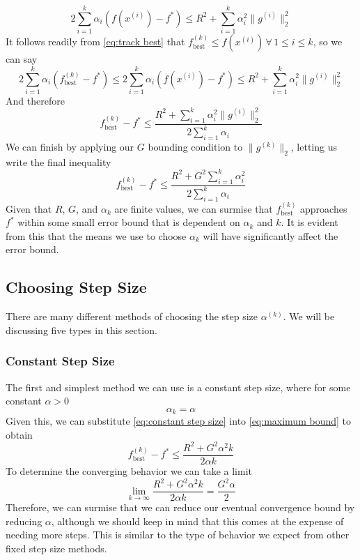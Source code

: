 \documentclass[journal,onecolumn]{IEEEtran}
\DeclareMathOperator{\best}{best}
\let\oldforall\forall
\renewcommand{\forall}{ \, \oldforall \, }
\begin{document}
\begin{equation}
    2\sum^k_{i=1}\alpha_i (f(x^{(i)})-f^*) \leq R^2  + \sum^k_{i=1}\alpha^2_i\|g^{(i)}\|^2_2
\end{equation}
It follows readily from \eqref{eq:track best} that \(f^{(k)}_{\best} \leq f(x^{(i)}) \forall 1 \leq i \leq k\), so we can say
\begin{equation}
    2\sum^k_{i=1}\alpha_i (f^{(k)}_{\best}-f^*) \leq 2\sum^k_{i=1}\alpha_i (f(x^{(i)})-f^*) \leq R^2  + \sum^k_{i=1}\alpha^2_i\|g^{(i)}\|^2_2
\end{equation}
And therefore
\begin{equation}\label{eq:general bound}
    f^{(k)}_{\best}-f^* \leq \frac{R^2  + \sum^k_{i=1}\alpha^2_i\|g^{(i)}\|^2_2}{2\sum^k_{i=1}\alpha_i}
\end{equation}
We can finish by applying our \(G\) bounding condition to \(\|g^{(k)}\|_2\), letting us write the final inequality
\begin{equation}\label{eq:maximum bound}
    f^{(k)}_{\best}-f^* \leq \frac{R^2  + G^2 \sum^k_{i=1}\alpha^2_i}{2\sum^k_{i=1}\alpha_i}
\end{equation}
Given that \(R\), \(G\), and \(\alpha_k\) are finite values, we can surmise that \(f^{(k)}_{\best}\) approaches \(f^*\) within some small error bound that is dependent on \(\alpha_k\) and \(k\). It is evident from this that the means we use to choose \(\alpha_k\) will have significantly affect the error bound.

\subsection{Choosing Step Size}\label{sec:choosing step size}
There are many different methods of choosing the step size \(\alpha^{(k)}\). We will be discussing five types in this section.

\subsubsection{Constant Step Size}\label{sec:constant step size}
The first and simplest method we can use is a constant step size, where for some constant \(\alpha > 0\)
\begin{equation}\label{eq:constant step size}
\alpha_{k} = \alpha
\end{equation}
Given this, we can substitute \eqref{eq:constant step size} into \eqref{eq:maximum bound} to obtain
\begin{equation}\label{eq:constant step size bound}
f^{(k)}_{\best}-f^* \leq \frac{R^2  + G^2 \alpha^2 k}{2\alpha k}
\end{equation}
To determine the converging behavior we can take a limit
\begin{equation}\label{eq:constant step size convergence}
\lim_{k \rightarrow \infty} \frac{R^2  + G^2 \alpha^2 k}{2\alpha k} = \frac{G^2 \alpha}{2}
\end{equation}
Therefore, we can surmise that we can reduce our eventual convergence bound by reducing \(\alpha\), although we should keep in mind that this comes at the expense of needing more steps. This is similar to the type of behavior we expect from other fixed step size methods.
\end{document}
